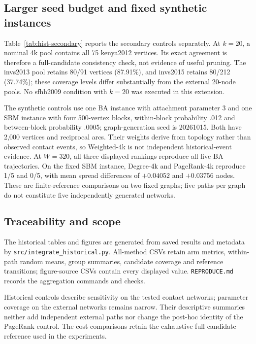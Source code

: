 \subsection{Larger seed budget and fixed synthetic instances}
Table~\ref{tab:hist-secondary} reports the secondary controls separately. At
$k=20$, a nominal 4k pool contains all 75 kenya2012 vertices. Its exact agreement
is therefore a full-candidate consistency check, not evidence of useful pruning.
The invs2013 pool retains 80/91 vertices (87.91\%), and invs2015 retains 80/212
(37.74\%); these coverage levels differ substantially from the external 20-node
pools. No sfhh2009 condition with $k=20$ was executed in this extension.

The synthetic controls use one BA instance with attachment parameter 3 and one
SBM instance with four 500-vertex blocks, within-block probability .012 and
between-block probability .0005; graph-generation seed is 20261015. Both have
2,000 vertices and reciprocal arcs. Their weights derive from topology rather
than observed contact events, so Weighted-4k is not independent historical-event
evidence. At $W=320$, all three displayed rankings reproduce all five BA
trajectories. On the fixed SBM instance, Degree-4k and PageRank-4k reproduce 1/5
and 0/5, with mean spread differences of $+0.04052$ and $+0.03756$ nodes. These
are finite-reference comparisons on two fixed graphs; five paths per graph do
not constitute five independently generated networks.


\subsection{Traceability and scope}
The historical tables and figures are generated from saved results and metadata
by \texttt{src/integrate\_historical.py}. All-method CSVs retain arm metrics,
within-path random means, group summaries, candidate coverage and reference
transitions; figure-source CSVs contain every displayed value.
\texttt{REPRODUCE.md} records the aggregation commands and checks.

Historical controls describe sensitivity on the tested contact networks;
parameter coverage on the external networks remains narrow. Their descriptive
summaries neither add independent external paths nor change the post-hoc
identity of the PageRank control. The cost comparisons retain the exhaustive
full-candidate reference used in the experiments.
